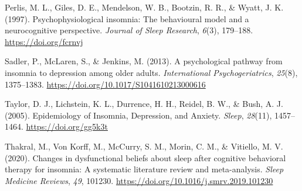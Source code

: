 \documentclass[
  ,doc,11pt, twoside,floatsintext]{apa6}
\newlength{\cslhangindent}
\newlength{\cslentryspacingunit} %
\newenvironment{CSLReferences}[2] %
 {%
  \setlength{\parindent}{0pt}
  \ifodd #1
  \let\oldpar\par
  \def\par{\hangindent=\cslhangindent\oldpar}
  \fi
  \setlength{\parskip}{#2\cslentryspacingunit}
 }%
 {}
\begin{document}
\begin{CSLReferences}{1}{0}
\leavevmode{}%
Perlis, M. L., Giles, D. E., Mendelson, W. B., Bootzin, R. R., \& Wyatt, J. K. (1997). Psychophysiological insomnia: The behavioural model and a neurocognitive perspective. \emph{Journal of Sleep Research}, \emph{6}(3), 179--188. \url{https://doi.org/fcrnvj}

\leavevmode{}%
Sadler, P., McLaren, S., \& Jenkins, M. (2013). A psychological pathway from insomnia to depression among older adults. \emph{International Psychogeriatrics}, \emph{25}(8), 1375--1383. \url{https://doi.org/10.1017/S1041610213000616}

\leavevmode{}%
Taylor, D. J., Lichstein, K. L., Durrence, H. H., Reidel, B. W., \& Bush, A. J. (2005). Epidemiology of {Insomnia}, {Depression}, and {Anxiety}. \emph{Sleep}, \emph{28}(11), 1457--1464. \url{https://doi.org/gg5k3t}

\leavevmode{}%
Thakral, M., Von Korff, M., McCurry, S. M., Morin, C. M., \& Vitiello, M. V. (2020). Changes in dysfunctional beliefs about sleep after cognitive behavioral therapy for insomnia: {A} systematic literature review and meta-analysis. \emph{Sleep Medicine Reviews}, \emph{49}, 101230. \url{https://doi.org/10.1016/j.smrv.2019.101230}

\end{CSLReferences}


\clearpage
\end{document}
